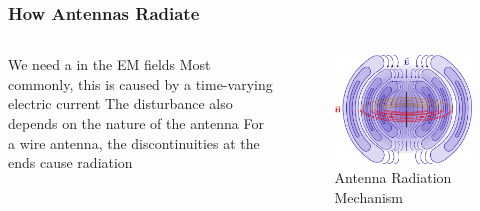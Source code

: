 \documentclass[10pt, compress]{beamer}
\begin{document}
\begin{frame}
  \frametitle{How Antennas Radiate}
  \begin{columns}[T] %
    \begin{column}{.4\textwidth}
      \begin{outline}
        \1 We need a \color{red}{disturbance} in the EM fields
        \2 Most commonly, this is caused by a time-varying electric current
        \1 The disturbance also depends on the nature of the antenna
        \2 For a wire antenna, the discontinuities at the ends cause radiation
      \end{outline}
    \end{column}
    \begin{column}[T]{.6\textwidth}
      \begin{figure}
        \centering
        \includegraphics[width=.9\textwidth]{radiation.pdf}
        \caption{Antenna Radiation Mechanism}
      \end{figure}
    \end{column}%
  \end{columns}
\end{frame}
\end{document}
